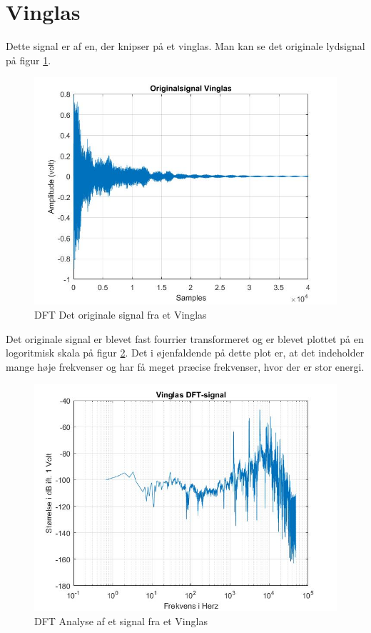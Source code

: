 \section{Vinglas}
Dette signal er af en, der knipser på et vinglas. Man kan se det originale lydsignal på figur \ref{fig:Vinglas original}.
\begin{figure}[H]
	\centering
	\includegraphics[width=140mm]{figures/Vinglas/original.jpg}
	\caption{DFT Det originale signal fra et Vinglas}
	\label{fig:Vinglas original}
\end{figure}

Det originale signal er blevet fast fourrier transformeret og er blevet plottet på en logoritmisk skala på figur \ref{fig:Vinglas DFT}. Det i øjenfaldende på dette plot er, at det indeholder mange høje frekvenser og har få meget præcise frekvenser, hvor der er stor energi.

\begin{figure}[H]
	\centering
	\includegraphics[width=140mm]{figures/Vinglas/DFT.jpg}
	\caption{DFT Analyse af et signal fra et Vinglas}
	\label{fig:Vinglas DFT}
\end{figure}

